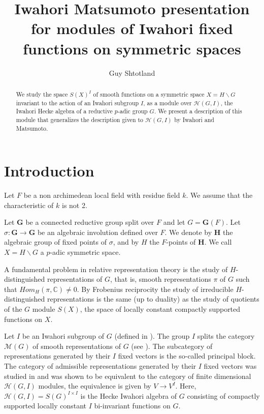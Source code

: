 \documentclass[12pt]{article}
\title{Iwahori Matsumoto presentation for modules of Iwahori fixed functions on symmetric spaces}
\author{Guy Shtotland }
\newcommand{\<}{\langle}
\renewcommand{\>}{\rangle}
\theoremstyle{plain}
\theoremstyle{definition}
\begin{document}
\maketitle

\setlength\parindent{0pt}

\begin{abstract}
     We study the space $S(X)^I$ of smooth functions on a symmetric space $X=H\backslash G$ invariant to the action of an Iwahori subgroup $I$, as a module over  $\mathcal{H}(G,I)$, the Iwahori Hecke algebra of a reductive $p$-adic group $G$. We present a description of this module that generalizes the description given to $\mathcal{H}(G,I)$ by Iwahori and Matsumoto.
\end{abstract}
    



\section{Introduction}
Let $F$ be a non archimedean local field with residue field $k$. We assume that the characteristic of $k$ is not 2.

Let $\mathbf{G}$ be a connected reductive group split over $F$ and let $G=\mathbf{G}(F)$. 
Let $\sigma:\mathbf{G}\rightarrow \mathbf{G}$ be an algebraic involution defined over $F$. We denote by $\mathbf{H}$ the algebraic group of fixed points of $\sigma$, and by $H$ the $F$-points of $\mathbf{H}$. We call
$X=H\backslash G$ a $p$-adic symmetric space. 

A fundamental problem in relative representation theory is the study of $H$-distinguished representations of $G$, that is, smooth representations $\pi$ of $G$ such that $Hom_H(\pi,\mathbb{C})\neq 0$. By Frobenius reciprocity the study of irreducible $H$-distinguished representations is the same (up to duality) as the study of quotients of the $G$ module $S(X)$, the space of locally constant compactly supported functions on $X$.


Let $I$ be an Iwahori subgroup of $G$ (defined in  \cite{PMIHES_1965__25__5_0}). The group $I$ splits the category $\mathcal{M}(G)$ of smooth representations of $G$ (see \cite{Benrstein_Center}). The subcategory of representations generated by their $I$ fixed vectors is the so-called principal block. The category of admissible representations generated by their $I$ fixed vectors was studied in \cite{Borel1976} and was shown to be equivalent to the category of finite dimensional $\mathcal{H}(G,I)$ modules, the equivalence is given by $V\rightarrow V^I$.
Here, $\mathcal{H}(G,I)=S(G)^{I\times I}$ is the Hecke Iwahori algebra of $G$ consisting of compactly supported locally constant $I$ bi-invariant functions on $G$.
\end{document}
